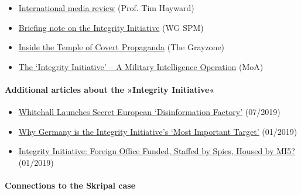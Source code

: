 \begin{itemize}
\tightlist
\item
  \href{https://timhayward.wordpress.com/2018/12/15/integrity-grasping-the-initiative}{International
  media review} (Prof. Tim Hayward)
\item
  \href{http://syriapropagandamedia.org/working-papers/briefing-note-on-the-integrity-initiative}{Briefing
  note on the Integrity Initiative} (WG SPM)
\item
  \href{https://thegrayzone.com/2018/12/17/inside-the-temple-of-covert-propaganda-the-integrity-initiative-and-the-uks-scandalous-information-war/}{Inside
  the Temple of Covert Propaganda} (The Grayzone)
\item
  \href{https://www.moonofalabama.org/2018/12/the-strange-mind-of-christopher-nigel-donnelly.html}{The
  `Integrity Initiative' -- A Military Intelligence Operation} (MoA)
\end{itemize}

\hypertarget{additional-articles-about-the-integrity-initiative}{%
\paragraph{Additional articles about the »Integrity
Initiative«}\label{additional-articles-about-the-integrity-initiative}}

\begin{itemize}
\tightlist
\item
  \href{https://medium.com/@KitKlarenberg/integrity-initiative-in-hiding-whitehall-launches-secret-european-disinformation-factory-757bdb05cb2}{Whitehall
  Launches Secret European `Disinformation Factory'} (07/2019)
\item
  \href{https://medium.com/@KitKlarenberg/damaging-ties-why-germany-is-the-integrity-initiatives-most-important-target-10cc7d1ecb42}{Why
  Germany is the Integrity Initiative's `Most Important Target'}
  (01/2019)
\item
  \href{https://medium.com/@KitKlarenberg/integrity-initiative-foreign-office-funded-staffed-by-spies-housed-by-mi5-aca31eda86ba}{Integrity
  Initiative: Foreign Office Funded, Staffed by Spies, Housed by MI5?}
  (01/2019)
\end{itemize}

\hypertarget{connections-to-the-skripal-case}{%
\paragraph{Connections to the Skripal
case}\label{connections-to-the-skripal-case}}

